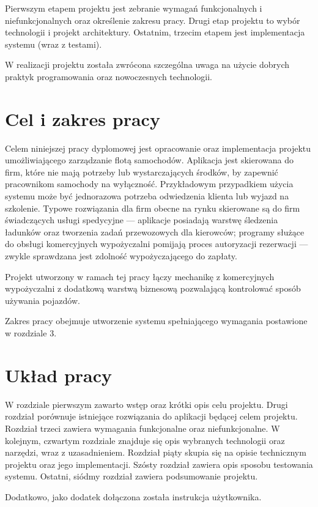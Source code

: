 \documentclass[eng,printmode,openany]{mgr}
\begin{document}
	Pierwszym etapem projektu jest zebranie wymagań funkcjonalnych i niefunkcjonalnych oraz określenie zakresu pracy. Drugi etap projektu to wybór technologii i projekt architektury. Ostatnim, trzecim etapem jest implementacja systemu (wraz z testami).
	
	W realizacji projektu została zwrócona szczególna uwaga na użycie dobrych praktyk programowania oraz nowoczesnych technologii.
	
	\section{Cel i zakres pracy}
	Celem niniejszej pracy dyplomowej jest opracowanie oraz implementacja projektu umożliwiającego zarządzanie flotą samochodów. Aplikacja jest skierowana do firm, które nie mają potrzeby lub wystarczających środków, by zapewnić pracownikom samochody na wyłączność. Przykładowym przypadkiem użycia systemu może być jednorazowa potrzeba odwiedzenia klienta lub wyjazd na szkolenie. Typowe rozwiązania dla firm obecne na rynku skierowane są do firm świadczących usługi spedycyjne — aplikacje posiadają warstwę śledzenia ładunków oraz tworzenia zadań przewozowych dla kierowców; programy służące do obsługi komercyjnych wypożyczalni pomijają proces autoryzacji rezerwacji — zwykle sprawdzana jest zdolność wypożyczającego do zapłaty.
	
	Projekt utworzony w ramach tej pracy łączy mechanikę z komercyjnych wypożyczalni z dodatkową warstwą biznesową pozwalającą kontrolować sposób używania pojazdów.
	
	Zakres pracy obejmuje utworzenie systemu spełniającego wymagania postawione w rozdziale 3.
	
	\section{Układ pracy}
	W rozdziale pierwszym zawarto wstęp oraz krótki opis celu projektu. Drugi rozdział porównuje istniejące rozwiązania do aplikacji będącej celem projektu. Rozdział trzeci zawiera wymagania funkcjonalne oraz niefunkcjonalne. W kolejnym, czwartym rozdziale znajduje się opis wybranych technologii oraz narzędzi, wraz z uzasadnieniem. Rozdział piąty skupia się na opisie technicznym projektu oraz jego implementacji. Szósty rozdział zawiera opis sposobu testowania systemu. Ostatni, siódmy rozdział zawiera podsumowanie projektu.
	
	Dodatkowo, jako dodatek dołączona została instrukcja użytkownika.
	
\end{document}
